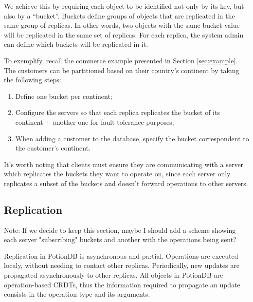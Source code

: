 \documentclass{vldb}
\newcommand{\grumbler}[2]{{\color{red}{\bf #1:} #2}}
\newcommand{\andre}[1]{\grumbler{andre}{#1}}
\begin{document}
We achieve this by requiring each object to be identified not only by its key, but also by a ``bucket''.
Buckets define groups of objects that are replicated in the same group of replicas. In other words, two objects with the same bucket value will be replicated in the same set of replicas.
For each replica, the system admin can define which buckets will be replicated in it.

To exemplify, recall the commerce example presented in Section \ref{sec:example}.
The customers can be partitioned based on their country's continent by taking the following steps: 

\begin{enumerate}
	\item Define one bucket per continent;
	\item Configure the servers so that each replica replicates the bucket of its continent + another one for fault tolerance purposes;
	\item When adding a customer to the database, specify the bucket correspondent to the customer's continent.
\end{enumerate}

It's worth noting that clients must ensure they are communicating with a server which replicates the buckets they want to operate on, since each server only replicates a subset of the buckets and doesn't forward operations to other servers.

\subsection{Replication}
\label{subsec:replication}

\andre{Note: If we decide to keep this section, maybe I should add a scheme showing each server "subscribing" buckets and another with the operations being sent?}

Replication in PotionDB is asynchronous and partial.
Operations are executed localy, without needing to contact other replicas.
Periodically, new updates are propagated asynchronously to other replicas.
All objects in PotionDB are operation-based CRDTs, thus the information required to propagate an update consists in the operation type and its arguments.
\end{document}
